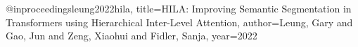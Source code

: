 @inproceedings{leung2022hila,
    title={HILA: Improving Semantic Segmentation in Transformers using Hierarchical Inter-Level Attention},
    author={Leung, Gary and Gao, Jun and Zeng, Xiaohui and Fidler, Sanja},
    year={2022}
}